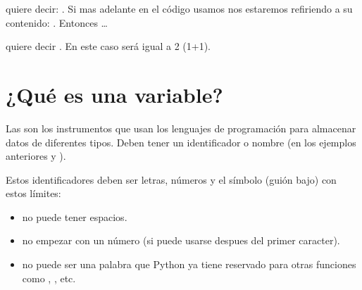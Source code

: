 \documentclass[a5paper,9pt,spanish]{sphinxmanual}
\begin{document}
\begin{sphinxVerbatim}[commandchars=\\\{\}]
  
\end{sphinxVerbatim}

\sphinxAtStartPar
quiere decir:  .
Si mas adelante en el código usamos  nos estaremos refiriendo a su contenido: .
Entonces …

\begin{sphinxVerbatim}[commandchars=\\\{\}]
    
\end{sphinxVerbatim}

\sphinxAtStartPar
quiere decir  .
En este caso  será igual a 2 (1+1).


\section{¿Qué es una variable?}
\label{\detokenize{interactivo:que-es-una-variable}}
\sphinxAtStartPar
Las  son los instrumentos que usan los lenguajes de programación para
almacenar datos de diferentes tipos.
Deben tener un identificador o nombre (en los ejemplos anteriores  y ).

\sphinxAtStartPar
Estos identificadores deben ser letras, números y el símbolo \sphinxstyleemphasis{\_} (guión bajo) con estos límites:
\begin{itemize}
\item {} 
\sphinxAtStartPar
no puede tener espacios.

\item {} 
\sphinxAtStartPar
no empezar con un número (si puede usarse despues del primer caracter).

\item {} 
\sphinxAtStartPar
no puede ser una palabra que Python ya tiene reservado para otras funciones como , , etc.

\end{itemize}
\end{document}
